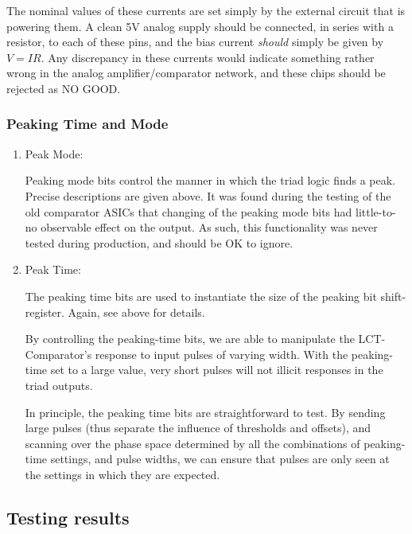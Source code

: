 \documentclass[letterpaper]{article}
\begin{document}
%
The nominal values of these currents are set simply by the external circuit that is powering them. A clean 5V analog supply should be connected, in series with a resistor, to each of these pins, and the bias current \emph{should} simply be given by $ V=IR $.
%
Any discrepancy in these currents would indicate something rather wrong in the analog amplifier/comparator network, and these chips should be rejected as NO GOOD.

\subsubsection{Peaking Time and Mode}

\begin {enumerate}

\item Peak Mode:

Peaking mode bits control the manner in which the triad logic finds a peak. Precise descriptions are given above.  It was found during the testing of the old comparator ASICs that changing of the peaking mode bits had little-to-no observable effect on the output. As such, this functionality was never tested during production, and should be OK to ignore.

\item Peak Time:

The peaking time bits are used to instantiate the size of the peaking bit shift-register. Again, see above for details.

By controlling the peaking-time bits, we are able to manipulate the LCT-Comparator's response to input pulses of varying width. With the peaking-time set to a large value, very short pulses will not illicit responses in the triad outputs.

In principle, the peaking time bits are straightforward to test. By sending large pulses (thus separate the influence of thresholds and offsets), and scanning over the phase space determined by all the combinations of peaking-time settings, and pulse widths, we can ensure that pulses are only seen at the settings in which they are expected.

\end{enumerate}


%
\subsection {Testing results}
\end{document}
